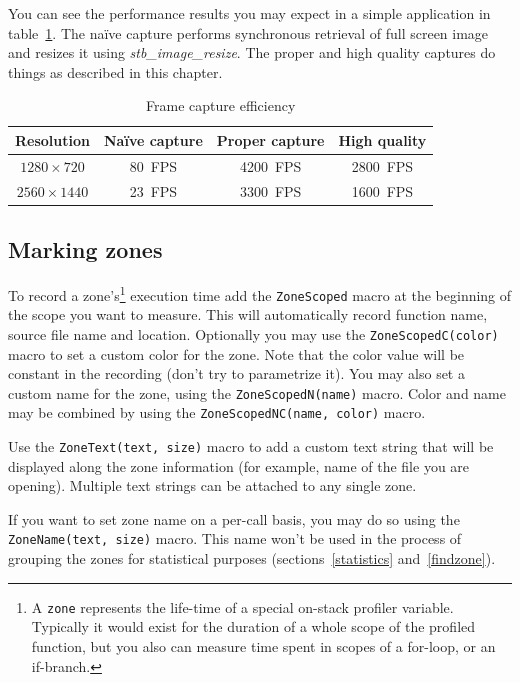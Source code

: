 \documentclass[hidelinks,titlepage,a4paper]{article}
\begin{document}
You can see the performance results you may expect in a simple application in table~\ref{asynccapture}. The na\"ive capture performs synchronous retrieval of full screen image and resizes it using \emph{stb\_image\_resize}. The proper and high quality captures do things as described in this chapter.

\begin{table}[h]
\centering
\begin{tabular}[h]{c|c|c|c}
\textbf{Resolution} & \textbf{Na\"ive capture} & \textbf{Proper capture} & \textbf{High quality} \\ \hline
$1280\times720$ & 80~FPS & 4200~FPS & 2800~FPS \\
$2560\times1440$ & 23~FPS & 3300~FPS & 1600~FPS
\end{tabular}
\caption{Frame capture efficiency}
\label{asynccapture}
\end{table}

\subsection{Marking zones}
\label{markingzones}

To record a zone's\footnote{A \texttt{zone} represents the life-time of a special on-stack profiler variable. Typically it would exist for the duration of a whole scope of the profiled function, but you also can measure time spent in scopes of a for-loop, or an if-branch.} execution time add the \texttt{ZoneScoped} macro at the beginning of the scope you want to measure. This will automatically record function name, source file name and location. Optionally you may use the \texttt{ZoneScopedC(color)} macro to set a custom color for the zone. Note that the color value will be constant in the recording (don't try to parametrize it). You may also set a custom name for the zone, using the \texttt{ZoneScopedN(name)} macro. Color and name may be combined by using the \texttt{ZoneScopedNC(name, color)} macro.

Use the \texttt{ZoneText(text, size)} macro to add a custom text string that will be displayed along the zone information (for example, name of the file you are opening). Multiple text strings can be attached to any single zone.

If you want to set zone name on a per-call basis, you may do so using the \texttt{ZoneName(text, size)} macro. This name won't be used in the process of grouping the zones for statistical purposes (sections~\ref{statistics} and~\ref{findzone}).
\end{document}
